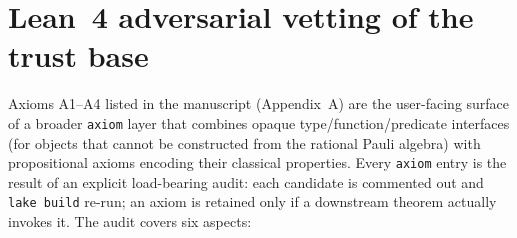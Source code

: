\documentclass[twocolumn,prx,aps,superscriptaddress,longbibliography]{revtex4-2}
\begin{document}
\section{Lean~4 adversarial vetting of the trust base}
\label{sm:lean-adversarial}

Axioms A1--A4 listed in the manuscript (Appendix~A) are the
user-facing surface of a broader \texttt{axiom} layer that
combines opaque type/\allowbreak{}function/\allowbreak{}predicate
interfaces (for objects that cannot be constructed from the rational
Pauli algebra) with propositional axioms encoding their classical
properties.  Every \texttt{axiom} entry is the result of an explicit
load-bearing audit: each candidate is commented out and
\texttt{lake build} re-run; an axiom is retained only if a downstream
theorem actually invokes it.  The audit covers six aspects:
\end{document}
